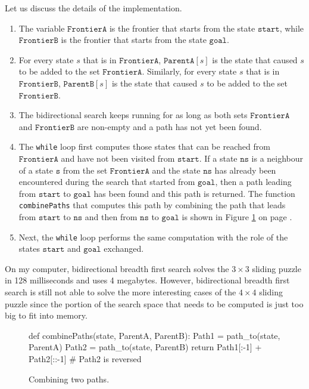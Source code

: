 Let us discuss the details of the implementation.
\begin{enumerate}
\item The variable $\texttt{FrontierA}$ is the frontier that starts from the state $\texttt{start}$, while
      $\texttt{FrontierB}$ is the frontier that starts from the state $\texttt{goal}$.
\item For every state $s$ that is in $\texttt{FrontierA}$, $\mathtt{ParentA}[s]$ is the state that caused $s$
      to be added to the set $\texttt{FrontierA}$.  Similarly, for every state $s$ that is in $\texttt{FrontierB}$,
      $\mathtt{ParentB}[s]$ is the state that caused $s$ to be added to the set $\texttt{FrontierB}$.
\item The bidirectional search keeps running for as long as both sets $\texttt{FrontierA}$ and
      $\texttt{FrontierB}$ are non-empty and a path has not yet been found.
\item The \texttt{while} loop first computes those states that can be reached from $\texttt{FrontierA}$ and have not been
      visited from $\texttt{start}$.  If a state $\texttt{ns}$ is a neighbour of a state $\texttt{s}$ from the set
      $\texttt{FrontierA}$ and the state $\texttt{ns}$ has already been encountered during the search that started
      from $\texttt{goal}$, then a path leading from $\texttt{start}$ to $\texttt{goal}$ has been found and this path
      is returned.  The function \texttt{combinePaths} that computes this path by combining the path that leads
      from $\texttt{start}$ to $\texttt{ns}$ and then from $\texttt{ns}$ to $\texttt{goal}$ is shown in Figure
      \ref{fig:combine-paths.stlx} on page \pageref{fig:combine-paths.stlx}.
\item Next, the \texttt{while} loop performs the same computation with the role of the states $\texttt{start}$
      and $\texttt{goal}$ exchanged. 
\end{enumerate}
On my computer, bidirectional breadth first search solves the $3 \times 3$ sliding puzzle in 128
milliseconds and uses 4 megabytes.  However, bidirectional breadth first search is still not able to solve the
more interesting cases of the $4 \times 4$ sliding puzzle since the portion of the search space that needs to
be computed is just too big to fit into memory. 

\begin{figure}[!ht]
\centering
\begin{python3code}
    def combinePaths(state, ParentA, ParentB):
            Path1 = path_to(state, ParentA)
            Path2 = path_to(state, ParentB)
            return Path1[:-1] + Path2[::-1] # Path2 is reversed
\end{python3code}
\vspace*{-0.3cm}
\caption{Combining two paths.}
\label{fig:combine-paths.stlx}
\end{figure}

